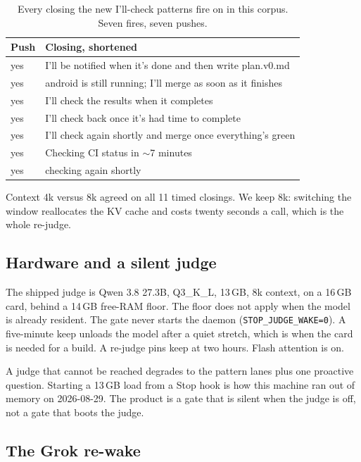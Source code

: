 \begin{table}[ht]
\centering
{\small\begin{tabular}{lp{7.6cm}}
\toprule
Push & Closing, shortened \\
\midrule
yes & I'll be notified when it's done and then write plan.v0.md \\
yes & android is still running; I'll merge as soon as it finishes \\
yes & I'll check the results when it completes \\
yes & I'll check back once it's had time to complete \\
yes & I'll check again shortly and merge once everything's green \\
yes & Checking CI status in $\sim$7 minutes \\
yes & checking again shortly \\
\bottomrule
\end{tabular}}
\caption{Every closing the new I'll-check patterns fire on in this
corpus. Seven fires, seven pushes.}
\label{tab:ill}
\end{table}



Context 4k versus 8k agreed on all 11 timed closings. We keep 8k:
switching the window reallocates the KV cache and costs twenty
seconds a call, which is the whole re-judge.


\subsection{Hardware and a silent judge}
\label{sec:hw}

The shipped judge is Qwen 3.8 27.3B, Q3\_K\_L, 13\,GB, 8k context, on
a 16\,GB card, behind a 14\,GB free-RAM floor. The floor does not
apply when the model is already resident. The gate never starts the
daemon (\texttt{STOP\_JUDGE\_WAKE=0}). A five-minute keep unloads the
model after a quiet stretch, which is when the card is needed for a
build. A re-judge pins keep at two hours. Flash attention is on.

A judge that cannot be reached degrades to the pattern lanes plus one
proactive question. Starting a 13\,GB load from a Stop hook is how
this machine ran out of memory on 2026-08-29. The product is a gate
that is silent when the judge is off, not a gate that boots the
judge.

\subsection{The Grok re-wake}
\label{sec:grokwire}

